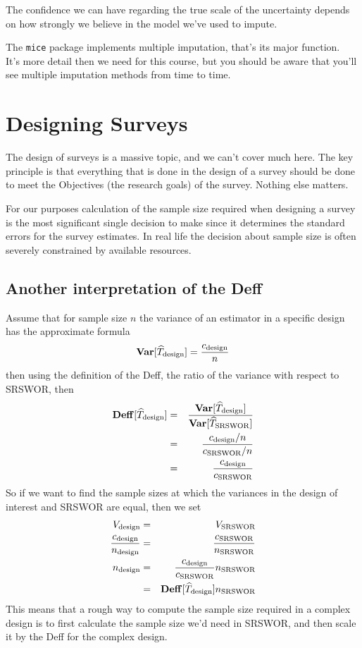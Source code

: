 \documentclass[
]{book}
\newcommand{\bfa}[2]{{\rm\bf #1}[#2]}
\begin{document}
The confidence we can have regarding the true scale of the uncertainty depends
on how strongly we believe in the model we've used to impute.

The \texttt{mice} package implements multiple imputation, that's its major function.\\
It's more detail then we need for this course, but you should be aware that
you'll see multiple imputation methods from time to time.

\chapter{Designing Surveys}\label{designing-surveys}

The design of surveys is a massive topic, and we can't cover much here.
The key principle is that everything that is done in the design of a survey
should be done to meet the Objectives (the research goals) of the survey. Nothing
else matters.

For our purposes calculation of the sample size required when designing
a survey is the most significant single decision to make since it determines
the standard errors for the survey estimates. In real life the decision
about sample size is often severely constrained by available resources.

\section{Another interpretation of the Deff}\label{another-interpretation-of-the-deff}

Assume that for sample size \(n\) the variance of an estimator
in a specific design has the approximate formula
\[
    \bfa{Var}{\widehat{T}_\text{design}} = \frac{c_\text{design}}{n}
\]
then using the definition of the Deff, the ratio of the variance with respect to
SRSWOR, then
\begin{eqnarray}
   \bfa{Deff}{\widehat{T}_{\text{design}}} 
       &=& \frac{\bfa{Var}{\widehat{T}_{\text{design}}}}{\bfa{Var}{\widehat{T}_{\text{SRSWOR}}}}\\
       &=& \frac{c_\text{design}/n}{c_\text{SRSWOR}/n}\\ 
       &=& \frac{c_\text{design}}{c_\text{SRSWOR}}
\end{eqnarray}
So if we want to find the sample sizes at which the variances
in the design of interest and SRSWOR are equal, then we set
\begin{eqnarray}
   V_\text{design} &=& V_\text{SRSWOR}\\
   \frac{c_\text{design}}{n_\text{design}} &=& \frac{c_\text{SRSWOR}}{n_\text{SRSWOR}}\\
   n_\text{design} &=& \frac{c_\text{design}}{c_\text{SRSWOR}}n_\text{SRSWOR}\\
                   &=& \bfa{Deff}{\widehat{T}_\text{design}} n_\text{SRSWOR}
\end{eqnarray}
This means that a rough way to compute the sample size required in a complex design
is to first calculate the sample size we'd need in SRSWOR, and then scale it by
the Deff for the complex design.
\end{document}
